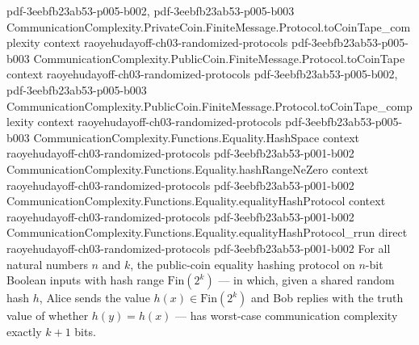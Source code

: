 \begin{theorem}
  {pdf-3eebfb23ab53-p005-b002,
    pdf-3eebfb23ab53-p005-b003}
\proofstep
  {CommunicationComplexity.PrivateCoin.FiniteMessage.Protocol.toCoinTape_complexity}
  {context}
  {raoyehudayoff-ch03-randomized-protocols}
  {pdf-3eebfb23ab53-p005-b003}
\proofstep
  {CommunicationComplexity.PublicCoin.FiniteMessage.Protocol.toCoinTape}
  {context}
  {raoyehudayoff-ch03-randomized-protocols}
  {pdf-3eebfb23ab53-p005-b002,
    pdf-3eebfb23ab53-p005-b003}
\proofstep
  {CommunicationComplexity.PublicCoin.FiniteMessage.Protocol.toCoinTape_complexity}
  {context}
  {raoyehudayoff-ch03-randomized-protocols}
  {pdf-3eebfb23ab53-p005-b003}
\proofstep
  {CommunicationComplexity.Functions.Equality.HashSpace}
  {context}
  {raoyehudayoff-ch03-randomized-protocols}
  {pdf-3eebfb23ab53-p001-b002}
\proofstep
  {CommunicationComplexity.Functions.Equality.hashRangeNeZero}
  {context}
  {raoyehudayoff-ch03-randomized-protocols}
  {pdf-3eebfb23ab53-p001-b002}
\proofstep
  {CommunicationComplexity.Functions.Equality.equalityHashProtocol}
  {context}
  {raoyehudayoff-ch03-randomized-protocols}
  {pdf-3eebfb23ab53-p001-b002}
\proofstep
  {CommunicationComplexity.Functions.Equality.equalityHashProtocol_rrun}
  {direct}
  {raoyehudayoff-ch03-randomized-protocols}
  {pdf-3eebfb23ab53-p001-b002}
For all natural numbers $n$ and $k$, the public-coin equality hashing protocol on
$n$-bit Boolean inputs with hash range $\mathrm{Fin}(2^k)$ — in which, given a shared
random hash $h$, Alice sends the value $h(x) \in \mathrm{Fin}(2^k)$ and Bob replies with
the truth value of whether $h(y) = h(x)$ — has worst-case communication complexity
exactly $k + 1$ bits.
\end{theorem}

